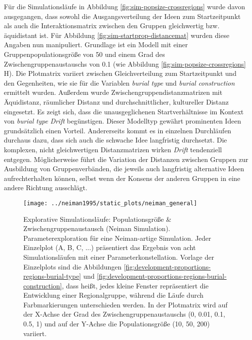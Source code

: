 \documentclass[openany,twoside,twocolumn]{book}
\begin{document}
Für die Simulationsläufe in Abbildung \ref{fig:sim-popsize-crossregions}
wurde davon ausgegangen, dass sowohl die Ausgangsverteilung der Ideen
zum Startzeitpunkt als auch die Interaktionsmatrix zwischen den Gruppen
gleichwertig bzw. äquidistant ist. Für Abbildung
\ref{fig:sim-startprop-distancemat} wurden diese Angaben nun
manipuliert. Grundlage ist ein Modell mit einer Gruppenpopulationsgröße
von 50 und einem Grad des Zwischengruppenaustauschs von 0.1 (wie
Abbildung \ref{fig:sim-popsize-crossregions} H). Die Plotmatrix variiert
zwischen Gleichverteilung zum Startzeitpunkt und den Gegenheiten, wie
sie für die Variablen \emph{burial type} und \emph{burial construction}
ermittelt wurden. Außerdem wurde Zwischengruppendistanzmatrizen mit
Äquidistanz, räumlicher Distanz und durchschnittlicher, kultureller
Distanz eingesetzt. Es zeigt sich, dass die unausgeglichenen
Startverhältnisse im Kontext von \emph{burial type} \emph{Drift}
begünstigen. Dieser Modelltyp gewährt prominenten Ideen grundsätzlich
einen Vorteil. Andererseits kommt es in einzelnen Durchläufen durchaus
dazu, dass sich auch die schwache Idee langfristig durchsetzt. Die
komplexen, nicht gleichwertigen Distanzmatrizen wirken \emph{Drift}
tendenziell entgegen. Möglicherweise führt die Variation der Distanzen
zwischen Gruppen zur Ausbildung von Gruppenverbänden, die jeweils auch
langfristig alternative Ideen aufrechterhalten können, selbst wenn der
Konsens der anderen Gruppen in eine andere Richtung ausschlägt.

\begin{figure}[!t]

{\centering \texttt{[image: ../neiman1995/static\_plots/neiman\_general]} 

}

\caption[Explorative Simulationsläufe: Populationsgröße \& Zwischengruppenaustausch (Neiman Simulation)]{Explorative Simulationsläufe: Populationsgröße \& Zwischengruppenaustausch (Neiman Simulation). Parameterexploration für eine Neiman-artige Simulation. Jeder Einzelplot (A, B, C, ...) präsentiert das Ergebnis von acht Simulationsläufen mit einer Parameterkonstellation. Vorlage der Einzelplots sind die Abbildungen \ref{fig:development-proportions-regions-burial-type} und \ref{fig:development-proportions-regions-burial-construction}, dass heißt, jedes kleine Fenster repräsentiert die Entwicklung einer Regionalgruppe, während die Läufe durch Farbmarkierungen unterschieden werden. In der Plotmatrix wird auf der X-Achse der Grad des Zwischengruppenaustauschs (0, 0.01, 0.1, 0.5, 1) und auf der Y-Achse die Populationsgröße (10, 50, 200) variiert.}\label{fig:neiman-general}
\end{figure}
\end{document}
